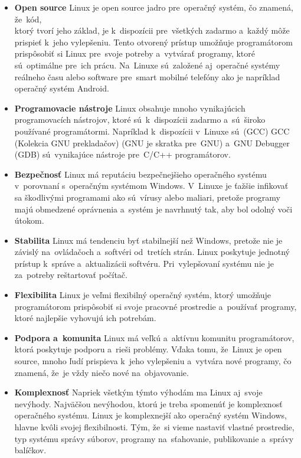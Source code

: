 \begin{itemize}
	\item \textbf{Open source} Linux je open source jadro pre~operačný systém, čo znamená, že~kód,\\
		ktorý tvorí jeho základ, je k~dispozícii pre~všetkých zadarmo a~každý môže prispieť
		k~jeho vylepšeniu. Tento otvorený prístup umožňuje programátorom prispôsobiť si Linux
		pre~svoje potreby a~vytvárať programy, ktoré sú~optimálne pre~ich prácu. Na~Linuxe
		sú~založené aj~operačné systémy reálneho času alebo software pre~smart mobilné telefóny
		ako je napríklad operačný systém Android.

	\item \textbf{Programovacie nástroje} Linux obsahuje mnoho vynikajúcich programovacích nástrojov, ktoré sú~k~dispozícii
		zadarmo a~sú~široko používané programátormi. Napríklad k~dispozícii v~Linuxe sú~(GCC) \acrlong{GCC} (Kolekcia GNU prekladačov)
		(GNU je skratka pre~\acrlong{GNU}) a~GNU Debugger (GDB) sú~vynikajúce nástroje pre~C/C++ programátorov.

	\item \textbf{Bezpečnosť} Linux má reputáciu bezpečnejšieho operačného systému v~porovnaní s~operačným systémom Windows.
		V~Linuxe je ťažšie infikovať sa škodlivými programami ako sú~vírusy alebo maliari, pretože programy majú obmedzené
		oprávnenia a~systém je navrhnutý tak, aby bol odolný voči útokom.

	\item \textbf{Stabilita} Linux má tendenciu byť stabilnejší než Windows, pretože nie je závislý na~ovládačoch a~softvéri
		od~tretích strán. Linux poskytuje jednotný prístup k~správe a~aktualizácii softvéru. Pri~vylepšovaní systému nie je
		za~potreby reštartovať počítač.

	\item \textbf{Flexibilita} Linux je veľmi flexibilný operačný systém, ktorý umožňuje programátorom prispôsobiť si svoje pracovné
		prostredie a~používať programy, ktoré najlepšie vyhovujú ich potrebám.

	\item \textbf{Podpora a~komunita} Linux má veľkú a~aktívnu komunitu programátorov, ktorá poskytuje podporu a~rieši problémy.
		Vďaka tomu, že~Linux je open source, mnoho ľudí prispieva k~jeho vylepšeniu a~vytvára nové programy, čo znamená, že~je vždy
		niečo nové na~objavovanie.

	\item \textbf{Komplexnosť} Napriek všetkým týmto výhodám ma Linux aj~svoje nevýhody. Najväčšou nevýhodou, ktorú je treba
		spomenúť je komplexnosť operačného systému. Linux je komplexnejší ako operačný systém Windows, hlavne kvôli svojej
		flexibilnosti. Tým, že~si vieme nastaviť vlastné prostredie, typ systému správy súborov, programy na~sťahovanie,
		publikovanie a~správy balíčkov.
\end{itemize}

